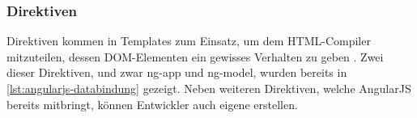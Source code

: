 \subsubsection{Direktiven}
\label{sec:direktiven}

Direktiven kommen in Templates zum Einsatz, um dem HTML-Compiler mitzuteilen, dessen DOM-Elementen ein gewisses Verhalten zu geben \cite{angularDoc}. Zwei dieser Direktiven, und zwar ng-app und ng-model, wurden bereits in \autoref{lst:angularjs-databindung} gezeigt. Neben weiteren Direktiven, welche AngularJS bereits mitbringt, können Entwickler auch eigene erstellen.